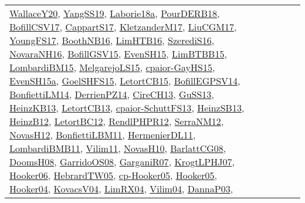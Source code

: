 {\begin{longtable}{llp{6cm}p{6cm}p{6cm}}
\href{articles/WallaceY20.pdf}{WallaceY20}\cite{WallaceY20}, \href{papers/YangSS19.pdf}{YangSS19}\cite{YangSS19}, \href{papers/Laborie18a.pdf}{Laborie18a}\cite{Laborie18a}, \href{articles/PourDERB18.pdf}{PourDERB18}\cite{PourDERB18}, \href{papers/BofillCSV17.pdf}{BofillCSV17}\cite{BofillCSV17}, \href{papers/CappartS17.pdf}{CappartS17}\cite{CappartS17}, \href{papers/KletzanderM17.pdf}{KletzanderM17}\cite{KletzanderM17}, \href{papers/LiuCGM17.pdf}{LiuCGM17}\cite{LiuCGM17}, \href{papers/YoungFS17.pdf}{YoungFS17}\cite{YoungFS17}, \href{papers/BoothNB16.pdf}{BoothNB16}\cite{BoothNB16}, \href{papers/LimHTB16.pdf}{LimHTB16}\cite{LimHTB16}, \href{papers/SzerediS16.pdf}{SzerediS16}\cite{SzerediS16}, \href{articles/NovaraNH16.pdf}{NovaraNH16}\cite{NovaraNH16}, \href{papers/BofillGSV15.pdf}{BofillGSV15}\cite{BofillGSV15}, \href{papers/EvenSH15.pdf}{EvenSH15}\cite{EvenSH15}, \href{papers/LimBTBB15.pdf}{LimBTBB15}\cite{LimBTBB15}, \href{papers/LombardiBM15.pdf}{LombardiBM15}\cite{LombardiBM15}, \href{papers/MelgarejoLS15.pdf}{MelgarejoLS15}\cite{MelgarejoLS15}, \href{papers/cpaior-GayHS15.pdf}{cpaior-GayHS15}\cite{cpaior-GayHS15}, \href{articles/EvenSH15a.pdf}{EvenSH15a}\cite{EvenSH15a}, \href{articles/GoelSHFS15.pdf}{GoelSHFS15}\cite{GoelSHFS15}, \href{articles/LetortCB15.pdf}{LetortCB15}\cite{LetortCB15}, \href{papers/BofillEGPSV14.pdf}{BofillEGPSV14}\cite{BofillEGPSV14}, \href{papers/BonfiettiLM14.pdf}{BonfiettiLM14}\cite{BonfiettiLM14}, \href{papers/DerrienPZ14.pdf}{DerrienPZ14}\cite{DerrienPZ14}, \href{papers/CireCH13.pdf}{CireCH13}\cite{CireCH13}, \href{papers/GuSS13.pdf}{GuSS13}\cite{GuSS13}, \href{papers/HeinzKB13.pdf}{HeinzKB13}\cite{HeinzKB13}, \href{papers/LetortCB13.pdf}{LetortCB13}\cite{LetortCB13}, \href{papers/cpaior-SchuttFS13.pdf}{cpaior-SchuttFS13}\cite{cpaior-SchuttFS13}, \href{articles/HeinzSB13.pdf}{HeinzSB13}\cite{HeinzSB13}, \href{papers/HeinzB12.pdf}{HeinzB12}\cite{HeinzB12}, \href{papers/LetortBC12.pdf}{LetortBC12}\cite{LetortBC12}, \href{papers/RendlPHPR12.pdf}{RendlPHPR12}\cite{RendlPHPR12}, \href{papers/SerraNM12.pdf}{SerraNM12}\cite{SerraNM12}, \href{articles/NovasH12.pdf}{NovasH12}\cite{NovasH12}, \href{papers/BonfiettiLBM11.pdf}{BonfiettiLBM11}\cite{BonfiettiLBM11}, \href{papers/HermenierDL11.pdf}{HermenierDL11}\cite{HermenierDL11}, \href{papers/LombardiBMB11.pdf}{LombardiBMB11}\cite{LombardiBMB11}, \href{papers/Vilim11.pdf}{Vilim11}\cite{Vilim11}, \href{articles/NovasH10.pdf}{NovasH10}\cite{NovasH10}, \href{papers/BarlattCG08.pdf}{BarlattCG08}\cite{BarlattCG08}, \href{papers/DoomsH08.pdf}{DoomsH08}\cite{DoomsH08}, \href{articles/GarridoOS08.pdf}{GarridoOS08}\cite{GarridoOS08}, \href{papers/GarganiR07.pdf}{GarganiR07}\cite{GarganiR07}, \href{papers/KrogtLPHJ07.pdf}{KrogtLPHJ07}\cite{KrogtLPHJ07}, \href{articles/Hooker06.pdf}{Hooker06}\cite{Hooker06}, \href{papers/HebrardTW05.pdf}{HebrardTW05}\cite{HebrardTW05}, \href{papers/cp-Hooker05.pdf}{cp-Hooker05}\cite{cp-Hooker05}, \href{articles/Hooker05.pdf}{Hooker05}\cite{Hooker05}, \href{papers/Hooker04.pdf}{Hooker04}\cite{Hooker04}, \href{papers/KovacsV04.pdf}{KovacsV04}\cite{KovacsV04}, \href{papers/LimRX04.pdf}{LimRX04}\cite{LimRX04}, \href{papers/Vilim04.pdf}{Vilim04}\cite{Vilim04}, \href{papers/DannaP03.pdf}{DannaP03}\cite{DannaP03}, 
\end{longtable}}

